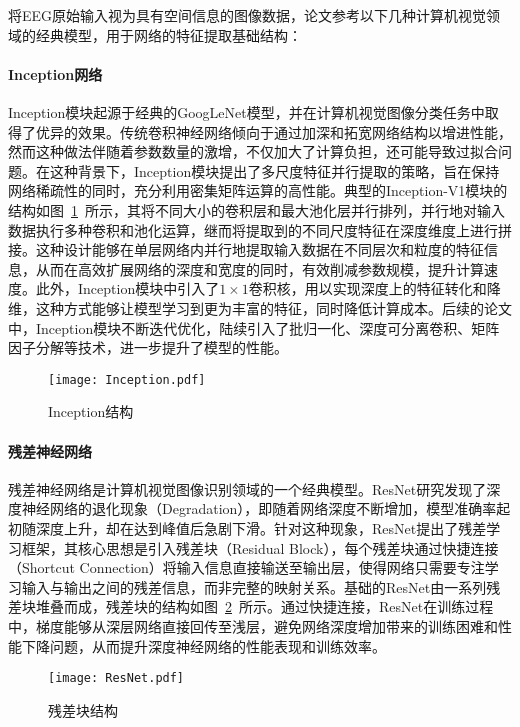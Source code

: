 将EEG原始输入视为具有空间信息的图像数据，论文参考以下几种计算机视觉领域的经典模型，用于网络的特征提取基础结构：

\paragraph{Inception网络}

Inception模块起源于经典的GoogLeNet模型\cite{szegedy2015going}，并在计算机视觉图像分类任务中取得了优异的效果。传统卷积神经网络倾向于通过加深和拓宽网络结构以增进性能，然而这种做法伴随着参数数量的激增，不仅加大了计算负担，还可能导致过拟合问题。在这种背景下，Inception模块提出了多尺度特征并行提取的策略，旨在保持网络稀疏性的同时，充分利用密集矩阵运算的高性能。典型的Inception-V1模块的结构如图~\ref{fig:Inception}~所示，其将不同大小的卷积层和最大池化层并行排列，并行地对输入数据执行多种卷积和池化运算，继而将提取到的不同尺度特征在深度维度上进行拼接。这种设计能够在单层网络内并行地提取输入数据在不同层次和粒度的特征信息，从而在高效扩展网络的深度和宽度的同时，有效削减参数规模，提升计算速度。此外，Inception模块中引入了\(1\times1\)卷积核，用以实现深度上的特征转化和降维，这种方式能够让模型学习到更为丰富的特征，同时降低计算成本。后续的论文中，Inception模块不断迭代优化，陆续引入了批归一化、深度可分离卷积、矩阵因子分解等技术，进一步提升了模型的性能\cite{szegedy2016rethinking,szegedy2017inception}。
\begin{figure}[ht]
  \centering
  \texttt{[image: Inception.pdf]}
  \caption{Inception结构\cite{szegedy2015going}}
  \label{fig:Inception}
\end{figure}

\paragraph{残差神经网络}

残差神经网络是计算机视觉图像识别领域的一个经典模型。ResNet研究发现了深度神经网络的退化现象（Degradation），即随着网络深度不断增加，模型准确率起初随深度上升，却在达到峰值后急剧下滑。针对这种现象，ResNet提出了残差学习框架，其核心思想是引入残差块（Residual Block），每个残差块通过快捷连接（Shortcut Connection）将输入信息直接输送至输出层，使得网络只需要专注学习输入与输出之间的残差信息，而非完整的映射关系。基础的ResNet由一系列残差块堆叠而成，残差块的结构如图~\ref{fig:ResNet}~所示。通过快捷连接，ResNet在训练过程中，梯度能够从深层网络直接回传至浅层，避免网络深度增加带来的训练困难和性能下降问题，从而提升深度神经网络的性能表现和训练效率。
\begin{figure}[ht]
  \centering
  \texttt{[image: ResNet.pdf]}
  \caption{残差块结构\cite{he2016deep}}
  \label{fig:ResNet}
\end{figure}

